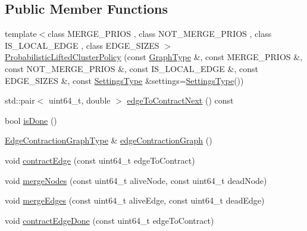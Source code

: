 \subsection*{Public Member Functions}
\begin{DoxyCompactItemize}
\item 
{\footnotesize template$<$class M\+E\+R\+G\+E\+\_\+\+P\+R\+I\+OS , class N\+O\+T\+\_\+\+M\+E\+R\+G\+E\+\_\+\+P\+R\+I\+OS , class I\+S\+\_\+\+L\+O\+C\+A\+L\+\_\+\+E\+D\+GE , class E\+D\+G\+E\+\_\+\+S\+I\+Z\+ES $>$ }\\\hyperlink{classnifty_1_1graph_1_1agglo_1_1ProbabilisticLiftedClusterPolicy_a4ccd736854852a0b56cc5bf9d1e21d0a}{Probabilistic\+Lifted\+Cluster\+Policy} (const \hyperlink{classnifty_1_1graph_1_1agglo_1_1ProbabilisticLiftedClusterPolicy_a196d3d530d5eed9f8a40172dcd93fa41}{Graph\+Type} \&, const M\+E\+R\+G\+E\+\_\+\+P\+R\+I\+OS \&, const N\+O\+T\+\_\+\+M\+E\+R\+G\+E\+\_\+\+P\+R\+I\+OS \&, const I\+S\+\_\+\+L\+O\+C\+A\+L\+\_\+\+E\+D\+GE \&, const E\+D\+G\+E\+\_\+\+S\+I\+Z\+ES \&, const \hyperlink{structnifty_1_1graph_1_1agglo_1_1ProbabilisticLiftedClusterPolicy_1_1SettingsType}{Settings\+Type} \&settings=\hyperlink{structnifty_1_1graph_1_1agglo_1_1ProbabilisticLiftedClusterPolicy_1_1SettingsType}{Settings\+Type}())
\item 
std\+::pair$<$ uint64\+\_\+t, double $>$ \hyperlink{classnifty_1_1graph_1_1agglo_1_1ProbabilisticLiftedClusterPolicy_a5f77f3b4d1fba47f53a7893879574277}{edge\+To\+Contract\+Next} () const
\item 
bool \hyperlink{classnifty_1_1graph_1_1agglo_1_1ProbabilisticLiftedClusterPolicy_a0c31097df93f81618b57bcef6d2cc139}{is\+Done} ()
\item 
\hyperlink{classnifty_1_1graph_1_1agglo_1_1ProbabilisticLiftedClusterPolicy_a328efe50fff8d430a835e8ffc50ba60f}{Edge\+Contraction\+Graph\+Type} \& \hyperlink{classnifty_1_1graph_1_1agglo_1_1ProbabilisticLiftedClusterPolicy_a088f4fb94d242b907e42cba7cbad8ba7}{edge\+Contraction\+Graph} ()
\item 
void \hyperlink{classnifty_1_1graph_1_1agglo_1_1ProbabilisticLiftedClusterPolicy_af8383e3011d7d3c895edc482c188e513}{contract\+Edge} (const uint64\+\_\+t edge\+To\+Contract)
\item 
void \hyperlink{classnifty_1_1graph_1_1agglo_1_1ProbabilisticLiftedClusterPolicy_a04589e80c304fcae51817abbce67bc43}{merge\+Nodes} (const uint64\+\_\+t alive\+Node, const uint64\+\_\+t dead\+Node)
\item 
void \hyperlink{classnifty_1_1graph_1_1agglo_1_1ProbabilisticLiftedClusterPolicy_a62bc28943144e3662b395c4ab41c65b9}{merge\+Edges} (const uint64\+\_\+t alive\+Edge, const uint64\+\_\+t dead\+Edge)
\item 
void \hyperlink{classnifty_1_1graph_1_1agglo_1_1ProbabilisticLiftedClusterPolicy_ab98af5a72c945086a6fac570200305c7}{contract\+Edge\+Done} (const uint64\+\_\+t edge\+To\+Contract)
\end{DoxyCompactItemize}
